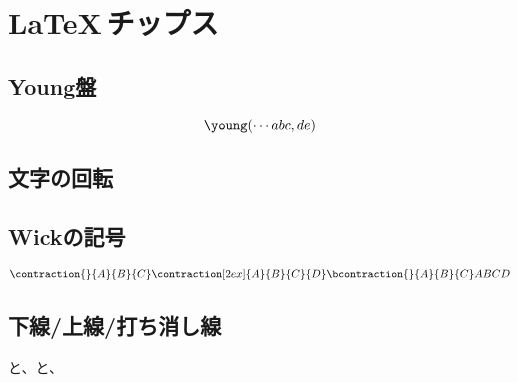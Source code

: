 \section{\LaTeX\,チップス}\label{s1:LaTexチップス} %
\subsection{Young盤}\label{s2:Young盤} %
	$$
	\young(\cdots abc, de)
	$$
\subsection{文字の回転}\label{s2:文字の回転} %
\subsection{Wickの記号}\label{s2:Wickの記号} %
	$$
	\contraction{}{A}{B}{C}
	\contraction[2ex]{A}{B}{C}{D}
	\bcontraction{}{A}{B}{C}
	ABCD
	$$
\subsection{下線/上線/打ち消し線}\label{s2:下線/上線/打ち消し線} %
	と、と、
